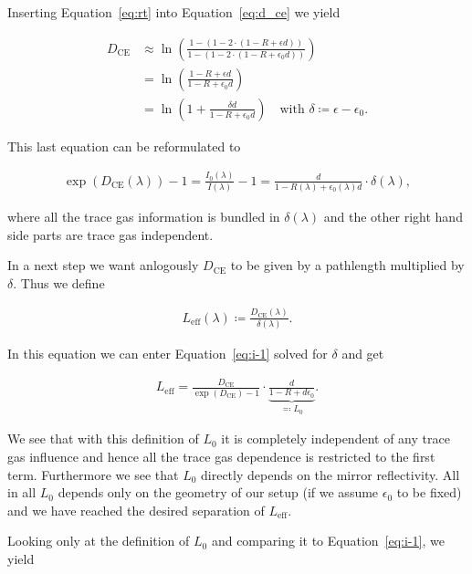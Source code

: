 Inserting Equation~\eqref{eq:rt} into Equation~\eqref{eq:d_ce} we
yield

\begin{align}
  D_{\text{CE}} & \approx \ln \left ( \frac{1 - (1 - 2\cdot ( 1- R +
  \epsilon d))}{1 - (1 - 2 \cdot (1 - R + \epsilon_0 d))}\right)\\
  & = \ln \left ( \frac{1 - R + \epsilon d}{1 - R + \epsilon_0
    d}\right) \\
  & = \ln \left ( 1 + \frac{ \delta d}{1 - R + \epsilon_0 d}\right) \quad
    \text{with } \delta \coloneqq \epsilon - \epsilon_0.
\end{align}

This last equation can be reformulated to

\begin{align}
  \exp(D_{\text{CE}}(\lambda)) - 1 = \frac{I_0(\lambda)}{I(\lambda)} -
  1 = \frac{d}{1 - R(\lambda) + \epsilon_0(\lambda) d} \cdot
  \delta(\lambda)\label{eq:i-1}, 
\end{align}

where all the trace gas information is bundled in $\delta(\lambda)$
and the other right hand side parts are trace gas independent.

In a next step we want anlogously $D_{\text{CE}}$ to be given by a
pathlength multiplied by $\delta$. Thus we define

\begin{align}
  L_{\text{eff}}(\lambda) \coloneqq \frac{D_{\text{CE}}(\lambda)}{\delta(\lambda)}.
\end{align}

In this equation we can enter Equation~\ref{eq:i-1} solved for
$\delta$ and get

\begin{align}
  L_{\text{eff}} = \frac{D_{\text{CE}}}{\exp(D_{\text{CE}}) - 1} \cdot
  \underbrace{\frac{d}{1 - R + d\epsilon_0}}_{\eqqcolon L_0}.
\end{align}

We see that with this definition of $L_0$ it is completely independent
of any trace gas influence and hence all the trace gas dependence is
restricted to the first term. Furthermore we see that $L_0$ directly
depends on the mirror reflectivity. All in all $L_0$ depends only on
the geometry of our setup (if we assume $\epsilon_0$ to be fixed) and
we have reached the desired separation of $L_{\text{eff}}$.

Looking only at the definition of $L_0$ and comparing it to
Equation~\eqref{eq:i-1}, we yield

